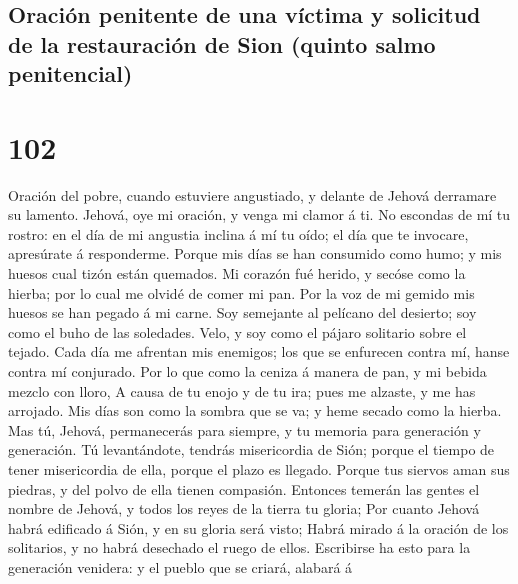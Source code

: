 \hypertarget{oraciuxf3n-penitente-de-una-vuxedctima-y-solicitud-de-la-restauraciuxf3n-de-sion-quinto-salmo-penitencial}{%
\subsection{Oración penitente de una víctima y solicitud de la
restauración de Sion (quinto salmo
penitencial)}\label{oraciuxf3n-penitente-de-una-vuxedctima-y-solicitud-de-la-restauraciuxf3n-de-sion-quinto-salmo-penitencial}}

\hypertarget{section-101}{%
\section{102}\label{section-101}}

 Oración del pobre, cuando estuviere angustiado, y delante
de Jehová derramare su lamento. Jehová, oye mi oración, y venga mi
clamor á ti.  No escondas de mí tu rostro: en el día de mi
angustia inclina á mí tu oído; el día que te invocare, apresúrate á
responderme.  Porque mis días se han consumido como humo;
y mis huesos cual tizón están quemados.  Mi corazón fué
herido, y secóse como la hierba; por lo cual me olvidé de comer mi pan.
 Por la voz de mi gemido mis huesos se han pegado á mi
carne.  Soy semejante al pelícano del desierto; soy como
el buho de las soledades.  Velo, y soy como el pájaro
solitario sobre el tejado.  Cada día me afrentan mis
enemigos; los que se enfurecen contra mí, hanse contra mí conjurado.
 Por lo que como la ceniza á manera de pan, y mi bebida
mezclo con lloro,  A causa de tu enojo y de tu ira; pues
me alzaste, y me has arrojado.  Mis días son como la
sombra que se va; y heme secado como la hierba.  Mas tú,
Jehová, permanecerás para siempre, y tu memoria para generación y
generación.  Tú levantándote, tendrás misericordia de
Sión; porque el tiempo de tener misericordia de ella, porque el plazo es
llegado.  Porque tus siervos aman sus piedras, y del
polvo de ella tienen compasión.  Entonces temerán las
gentes el nombre de Jehová, y todos los reyes de la tierra tu gloria;
 Por cuanto Jehová habrá edificado á Sión, y en su gloria
será visto;  Habrá mirado á la oración de los solitarios,
y no habrá desechado el ruego de ellos.  Escribirse ha
esto para la generación venidera: y el pueblo que se criará, alabará á
